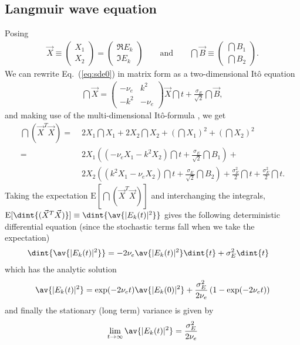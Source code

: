 \documentclass[10pt,a4paper]{article}
\newcommand{\eq}[1]{Eq.~(\ref{#1})}
\begin{document}
\subsection{Langmuir wave equation}
Posing 
\begin{align}
\vec{X}\equiv\begin{pmatrix}X_1\\X_2\end{pmatrix}
=\begin{pmatrix}\Re{E_{k}}\\\Im{E_{k}}\end{pmatrix}
\qquad\text{and}\qquad
\dint{\vec{B}}\equiv\begin{pmatrix}\dint{B_1}\\\dint{B_2}\end{pmatrix}.
\end{align}
We can rewrite \eq{eq:sde0} in matrix form as a two-dimensional It\^o
equation
\begin{align}
\dint{\vec{X}}=
\begin{pmatrix}{-}\nu_e&k^2\\{-}k^2&{-}\nu_e\end{pmatrix}
\vec{X}\dint{t}+\frac{\sigma_E}{\sqrt{2}}\dint{\vec{B}},
\end{align}
and making use of the multi-dimensional It\^o-formula \citep{oksendal:2000}, 
we get
\begin{align}
\dint{(\vec{X}^T\vec{X})} = &\;
2X_1\dint{X_1}+2X_2\dint{X_2}+(\dint{X_1})^2+(\dint{X_2})^2\nonumber\\
= &\;2X_1\left(\left(-\nu_eX_1{-}k^2X_2\right)\dint{t}+
\frac{\sigma_E}{\sqrt{2}}\dint{B_{1}}\right)+\nonumber\\
&\;2X_2\left(\left(k^2X_1{-}\nu_eX_2\right)\dint{t}+
\frac{\sigma_E}{\sqrt{2}}\dint{B_{2}}\right)+
\frac{\sigma_E^2}{2}\dint{t}{+}\frac{\sigma_E^2}{2}\dint{t}.\nonumber
\end{align}
Taking the expectation 
$\mathrm{E}[\dint{(\vec{X}^T\vec{X})}]$
and interchanging the integrals,
$\mathrm{E}[\dint{(\vec{X}^T\vec{X})}]\equiv\dint{\av{|E_k(t)|^2}}$
gives the following deterministic differential equation (since the
stochastic terms fall when we take the expectation)
\begin{align}
\dint{\av{|E_k(t)|^2}} &= -2\nu_e\av{|E_k(t)|^2}\dint{t}+\sigma_E^2\dint{t}
\end{align}
which has the analytic solution
\begin{align}
\av{|E_k(t)|^2} = \exp(-2\nu_et)\av{|E_k(0)|^2}+\frac{\sigma_E^2}{2\nu_e}
\left(1-\exp(-2\nu_et)\right)
\end{align}
and finally the stationary (long term) variance is given by
\begin{align}
\lim_{t\rightarrow\infty}\av{|E_k(t)|^2} = \frac{\sigma_E^2}{2\nu_e}
\end{align}
\end{document}
